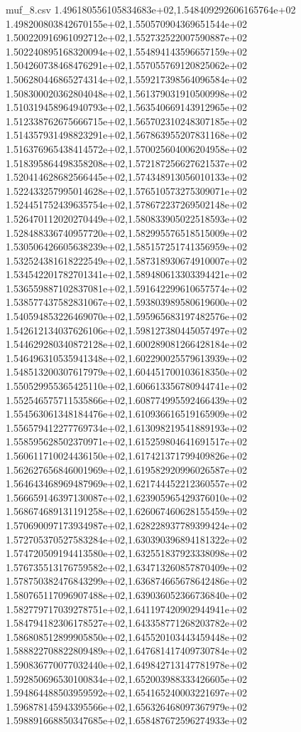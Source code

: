 \begin{filecontents*}{muf_8.csv}
1.496180556105834683e+02,1.548409292606165764e+02
1.498200803842670155e+02,1.550570904369651544e+02
1.500220916961092712e+02,1.552732522007590887e+02
1.502240895168320094e+02,1.554894143596657159e+02
1.504260738468476291e+02,1.557055769120825062e+02
1.506280446865274314e+02,1.559217398564096584e+02
1.508300020362804048e+02,1.561379031910500998e+02
1.510319458964940793e+02,1.563540669143912965e+02
1.512338762675666715e+02,1.565702310248307185e+02
1.514357931498823291e+02,1.567863955207831168e+02
1.516376965438414572e+02,1.570025604006204958e+02
1.518395864498358208e+02,1.572187256627621537e+02
1.520414628682566445e+02,1.574348913056010133e+02
1.522433257995014628e+02,1.576510573275309071e+02
1.524451752439635754e+02,1.578672237269502148e+02
1.526470112020270449e+02,1.580833905022518593e+02
1.528488336740957720e+02,1.582995576518515009e+02
1.530506426605638239e+02,1.585157251741356959e+02
1.532524381618222549e+02,1.587318930674910007e+02
1.534542201782701341e+02,1.589480613303394421e+02
1.536559887102837081e+02,1.591642299610657574e+02
1.538577437582831067e+02,1.593803989580619600e+02
1.540594853226469070e+02,1.595965683197482576e+02
1.542612134037626106e+02,1.598127380445057497e+02
1.544629280340872128e+02,1.600289081266428184e+02
1.546496310535941348e+02,1.602290025579613939e+02
1.548513200307617979e+02,1.604451700103618350e+02
1.550529955365425110e+02,1.606613356780944741e+02
1.552546575711535866e+02,1.608774995592466439e+02
1.554563061348184476e+02,1.610936616519165909e+02
1.556579412277769734e+02,1.613098219541889193e+02
1.558595628502370971e+02,1.615259804641691517e+02
1.560611710024436150e+02,1.617421371799409826e+02
1.562627656846001969e+02,1.619582920996026587e+02
1.564643468969487969e+02,1.621744452212360557e+02
1.566659146397130087e+02,1.623905965429376010e+02
1.568674689131191258e+02,1.626067460628155459e+02
1.570690097173934987e+02,1.628228937789399424e+02
1.572705370527583284e+02,1.630390396894181322e+02
1.574720509194413580e+02,1.632551837923338098e+02
1.576735513176759582e+02,1.634713260857870409e+02
1.578750382476843299e+02,1.636874665678642486e+02
1.580765117096907488e+02,1.639036052366736840e+02
1.582779717039278751e+02,1.641197420902944941e+02
1.584794182306178527e+02,1.643358771268203782e+02
1.586808512899905850e+02,1.645520103443459448e+02
1.588822708822809489e+02,1.647681417409730784e+02
1.590836770077032440e+02,1.649842713147781978e+02
1.592850696530100834e+02,1.652003988333426605e+02
1.594864488503959592e+02,1.654165240003221697e+02
1.596878145943395566e+02,1.656326468097367979e+02
1.598891668850347685e+02,1.658487672596274933e+02

\end{filecontents*}
